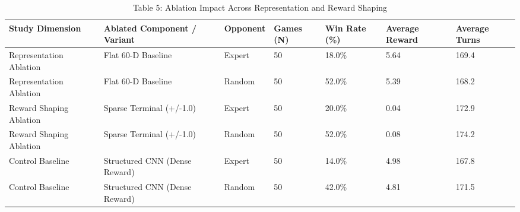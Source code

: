 \begin{table}
\caption{Table 5: Ablation Impact Across Representation and Reward Shaping}
\label{tab:table_ablation_results}
\begin{tabular}{lllllll}
\toprule
Study Dimension & Ablated Component / Variant & Opponent & Games (N) & Win Rate (\%) & Average Reward & Average Turns \\
\midrule
Representation Ablation & Flat 60-D Baseline & Expert & 50 & 18.0\% & 5.64 & 169.4 \\
Representation Ablation & Flat 60-D Baseline & Random & 50 & 52.0\% & 5.39 & 168.2 \\
Reward Shaping Ablation & Sparse Terminal (+/-1.0) & Expert & 50 & 20.0\% & 0.04 & 172.9 \\
Reward Shaping Ablation & Sparse Terminal (+/-1.0) & Random & 50 & 52.0\% & 0.08 & 174.2 \\
Control Baseline & Structured CNN (Dense Reward) & Expert & 50 & 14.0\% & 4.98 & 167.8 \\
Control Baseline & Structured CNN (Dense Reward) & Random & 50 & 42.0\% & 4.81 & 171.5 \\
\bottomrule
\end{tabular}
\end{table}
